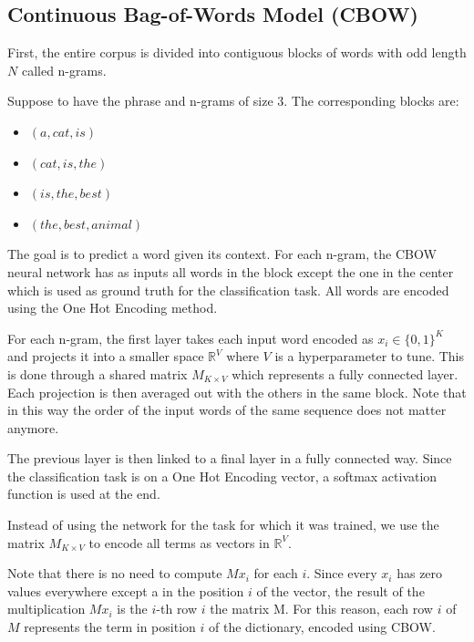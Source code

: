 \subsection{Continuous Bag-of-Words Model (CBOW)}
First, the entire corpus is divided into contiguous blocks of words with odd length $N$ called n-grams.

Suppose to have the phrase  and n-grams of size $3$.
The corresponding blocks are:
\begin{multicols}{2}
    \begin{itemize}
        \item $(a, cat, is)$
        \item $(cat, is, the)$
        \item $(is, the, best)$
        \item $(the, best, animal)$
    \end{itemize}
\end{multicols}

The goal is to predict a word given its context.
For each n-gram, the CBOW neural network has as inputs all words in the block
except the one in the center which is used as ground truth for the classification task.
All words are encoded using the One Hot Encoding method.

For each n-gram, the first layer takes each input word encoded as $x_i \in \{0, 1\}^K$ and projects it into a smaller space $\mathbb{R}^V$
where $V$ is a hyperparameter to tune.
This is done through a shared matrix $M_{K \times V}$ which represents a fully connected layer.
Each projection is then averaged out with the others in the same block.
Note that in this way the order of the input words of the same sequence does not matter anymore.

The previous layer is then linked to a final layer in a fully connected way.
Since the classification task is on a One Hot Encoding vector,
a softmax activation function is used at the end.

Instead of using the network for the task for which it was trained, we use the matrix $M_{K \times V}$ to encode all terms as vectors in $\mathbb{R}^V$.

Note that there is no need to compute $M x_i$ for each $i$.
Since every $x_i$ has zero values everywhere except a  in the position $i$ of the vector, the result of the multiplication $M x_i$ is the $i$-th row $i$ the matrix M.
For this reason, each row $i$ of $M$ represents the term in position $i$ of the dictionary, encoded using CBOW.

